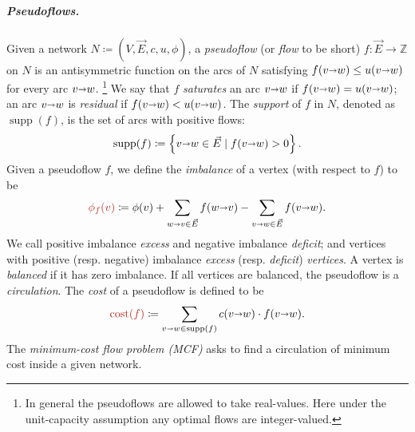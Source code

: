 \documentclass[a4paper,UKenglish]{socg-lipics-v2018}
\makeatletter
\def\ints{\mathbb{Z}}
\def\Set#1{\left\{ #1 \right\}}
\def\fsupply{\phi}
\def\arcto{\mathord\shortrightarrow}
\def\arc#1#2{#1\arcto#2}
\def\cost{\operatorname{cost}}
\def\supp{\operatorname{supp}}
\theoremstyle{plain}
\numberwithin{figure}{section}
\renewcommand{\paragraph}{\subparagraph}
\def\EMPH#1{\textcolor{BrickRed}{{\emph{#1}}}}
\def\n@te#1{\textsf{\boldmath \textbf{$\langle\!\langle$#1$\rangle\!\rangle$}}\leavevmode}
\def\note#1{\textcolor{red}{\n@te{#1}}}
\makeatother
\begin{document}
\begin{toappendix}
\paragraph{Pseudoflows.}
Given a network $N \coloneqq (V,\vec{E},c,u,\fsupply)$,
a \EMPH{pseudoflow} (or \EMPH{flow} to be short) $f\colon \vec{E} \to \ints$
on $N$ is an antisymmetric function on the arcs of $N$ satisfying $f(\arc vw) \leq u(\arc vw)$ for every arc $\arc vw$.
\footnote{In general the pseudoflows are allowed to take real-values. Here under the unit-capacity assumption any optimal flows are integer-valued.}
%
%
We say that $f$ \EMPH{saturates} an arc $\arc vw$ if $f(\arc vw) = u(\arc vw)$; an arc $\arc vw$ is \EMPH{residual} if $f(\arc vw) < u(\arc vw)$.
The \EMPH{support} of $f$ in $N$, denoted as \EMPH{$\supp(f)$}, is the set of arcs with positive flows:
\[
\supp(f) \coloneqq \Set{\arc vw \in \vec{E} \mid f(\arc vw) > 0}.
\]
%
Given a pseudoflow $f$, we define the \EMPH{imbalance} of a vertex (with respect to $f$) to be
\[
\EMPH{$\fsupply_f (v)$} \coloneqq \fsupply(v) + \sum_{\arc wv \in \vec{E}}{f(\arc wv)} - \sum_{\arc vw \in \vec{E}}{f(\arc vw)}.
\]
We call positive imbalance \EMPH{excess} and negative imbalance \EMPH{deficit};
and vertices with positive (resp. negative) imbalance \EMPH{excess} (resp. \EMPH{deficit}) \EMPH{vertices}.
A vertex is \EMPH{balanced} if it has zero imbalance.
If all vertices are balanced, the pseudoflow is a \EMPH{circulation}.
The \EMPH{cost} of a pseudoflow
is defined to be
\[
 \EMPH{$\cost(f)$} \coloneqq \sum_{\arc vw \in \supp(f)} c(\arc vw) \cdot f(\arc vw).
\]
%
The \EMPH{minimum-cost flow problem (MCF)} asks to find a circulation of minimum cost inside a given network.



\end{toappendix}
\end{document}
